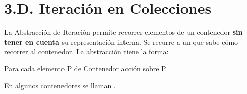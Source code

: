\section*{3.D. Iteración en Colecciones}
\label{sec:iteracionColecciones}


La Abstracción de Iteración permite recorrer elementos de un contenedor \textbf{sin tener en cuenta} su representación interna. Se recurre a un  que sabe cómo recorrer al contenedor. La abstracción tiene la forma:

\hfil
\begin{minipage}{.4\textwidth}
\begin{pyverbatim}[][frame=single] 
Para cada elemento P de Contenedor
    acción sobre P
\end{pyverbatim}
\end{minipage}

En  algunos contenedores  se llaman . 

